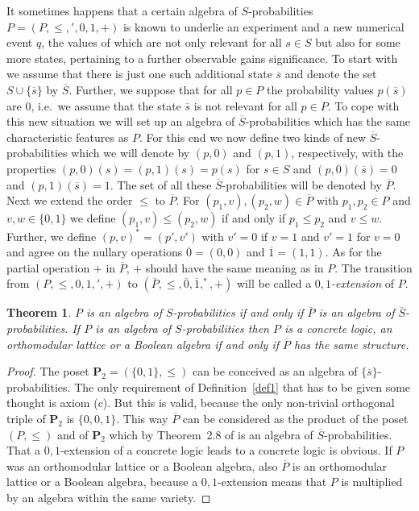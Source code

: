\documentclass[12pt]{article}
\newtheorem{theorem}{Theorem}[section]
\begin{document}
It sometimes happens that a certain algebra of $S$-probabilities $P=(P,\leq,{}',0,1,+)$ is known to underlie an experiment and a new numerical event $q$, the values of which are not only relevant for all $s\in S$ but also for some more states, pertaining to a further observable gains significance. To start with we assume that there is just one such additional state $\overline s$ and denote the set $S\cup\{\overline s\}$ by $\overline S$. Further, we suppose that for all $p\in P$ the probability values $p(\overline s)$ are $0$, i.e.\ we assume that the state $\overline s$ is not relevant for all $p\in P$. To cope with this new situation we will set up an algebra of $\overline S$-probabilities which has the same characteristic features as $P$. For this end we now define two kinds of new $\overline S$-probabilities which we will denote by $(p,0)$ and $(p,1)$, respectively, with the properties $(p,0)(s)=(p,1)(s)=p(s)$ for $s\in S$ and $(p,0)(\overline s)=0$ and $(p,1)(\overline s)=1$. The set of all these $\overline S$-probabilities will be denoted by $\overline P$. Next we extend the order $\le$ to $\overline P$. For $(p_1,v),(p_2,w)\in\overline P$ with $p_1,p_2\in P$ and $v,w\in\{0,1\}$ we define $(p_1,v)\le(p_2,w)$ if and only if $p_1\le p_2$ and $v\le w$. Further, we define $(p,v)^*=(p',v')$ with $v'=0$ if $v=1$ and $v'=1$ for $v=0$ and agree on the nullary operations $\overline0=(0,0)$ and $\overline1=(1,1)$. As for the partial operation $+$ in $\overline P$, $+$ should have the same meaning as in $P$. The transition from $(P,\le,0,1,{}',+)$ to $(\overline P,\le,\overline0,\overline1,^*,+)$ will be called a {\em $0,1$-extension} of $P$.

\begin{theorem}\label{th1}
$P$ is an algebra of $S$-probabilities if and only if $\overline P$ is an algebra of $\overline S$-probabilities. If $P$ is an algebra of $S$-probabilities then $P$ is a concrete logic, an orthomodular lattice or a Boolean algebra if and only if $\overline P$ has the same structure.
\end{theorem}

\begin{proof}
The poset $\mathbf P_2=(\{0,1\},\le)$ can be conceived as an algebra of $\{\overline s\}$-probabilities. The only requirement of Definition~\ref{def1} that has to be given some thought is axiom (c). But this is valid, because the only non-trivial orthogonal triple of $\mathbf P_2$ is $\{0,0,1\}$. This way $\overline P$ can be considered as the product of the poset $(P,\le)$ and of $\mathbf P_2$ which by Theorem~2.8 of \cite{DDL} is an algebra of $\overline S$-probabilities. That a $0,1$-extension of a concrete logic leads to a concrete logic is obvious. If $P$ was an orthomodular lattice or a Boolean algebra, also $\overline P$ is an orthomodular lattice or a Boolean algebra, because a $0,1$-extension means that $P$ is multiplied by an algebra within the same variety. 
\end{proof} 
\end{document}
